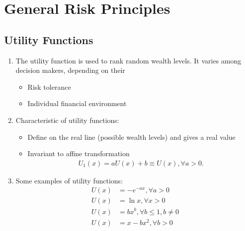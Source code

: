 \documentclass[12pt,twoside]{article}
\begin{document}
\newpage 

\section{General Risk Principles}
\subsection{Utility Functions}

\begin{enumerate}
\item The utility function is used to rank random wealth levels. It varies among decision makers, depending on their
	\begin{itemize}
		\item Risk tolerance
		\item Individual financial environment
	\end{itemize}

\item Characteristic of utility functions:
	\begin{itemize}
		\item Define on the real line (possible wealth levels) and gives a real value
		\item Invariant to affine transformation
			\begin{align*}
				U_1(x) = aU(x) + b \equiv U(x), \forall a>0.
			\end{align*}				
	\end{itemize}

\item Some examples of utility functions:
	\begin{align*}
		U(x) & = - e^{-ax}, \forall a>0\\
		U(x) & = \ln x, \forall x>0\\
		U(x) & = bx^b, \forall b\leq 1, b\neq 0\\
		U(x) & = x - bx^2, \forall b>0
	\end{align*}
	
\end{enumerate}
\end{document}
